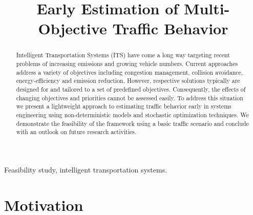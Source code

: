 \documentclass[conference]{../cls/IEEEtran}
\begin{document}
\title{Early Estimation of Multi-Objective Traffic Behavior}

\author{
	\and
}

\maketitle

\begin{abstract}
Intelligent Transportation Systems (ITS) have come a long way targeting recent problems of increasing emissions and growing vehicle numbers. Current approaches address a variety of objectives including congestion management, collision avoidance, energy-efficiency and emission reduction. However, respective solutions typically are designed for and tailored to a set of predefined objectives. Consequently, the effects of changing objectives and priorities cannot be assessed easily. To address this situation we present a lightweight approach to estimating traffic behavior early in systems engineering using non-deterministic models and stochastic optimization techniques. We demonstrate the feasibility of the framework using a basic traffic scenario and conclude with an outlook on future research activities.
\end{abstract}

\begin{IEEEkeywords}
Feasibility study, intelligent transportation systems.
\end{IEEEkeywords}

\section{Motivation}
\label{sec:motivation}
\end{document}

